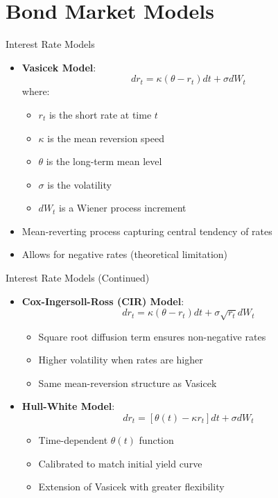 \documentclass{beamer}
\begin{document}
\section{Bond Market Models}

\begin{frame}{Interest Rate Models}
\begin{itemize}
    \item \textbf{Vasicek Model}:
    \begin{equation}
    dr_t = \kappa(\theta - r_t)dt + \sigma dW_t
    \end{equation}
    where:
    \begin{itemize}
        \item $r_t$ is the short rate at time $t$
        \item $\kappa$ is the mean reversion speed
        \item $\theta$ is the long-term mean level
        \item $\sigma$ is the volatility
        \item $dW_t$ is a Wiener process increment
    \end{itemize}
    \item Mean-reverting process capturing central tendency of rates
    \item Allows for negative rates (theoretical limitation)
\end{itemize}
\end{frame}

\begin{frame}{Interest Rate Models (Continued)}
\begin{itemize}
    \item \textbf{Cox-Ingersoll-Ross (CIR) Model}:
    \begin{equation}
    dr_t = \kappa(\theta - r_t)dt + \sigma\sqrt{r_t}dW_t
    \end{equation}
    \begin{itemize}
        \item Square root diffusion term ensures non-negative rates
        \item Higher volatility when rates are higher
        \item Same mean-reversion structure as Vasicek
    \end{itemize}
    
    \item \textbf{Hull-White Model}:
    \begin{equation}
    dr_t = [\theta(t) - \kappa r_t]dt + \sigma dW_t
    \end{equation}
    \begin{itemize}
        \item Time-dependent $\theta(t)$ function
        \item Calibrated to match initial yield curve
        \item Extension of Vasicek with greater flexibility
    \end{itemize}
\end{itemize}
\end{frame}
\end{document}
